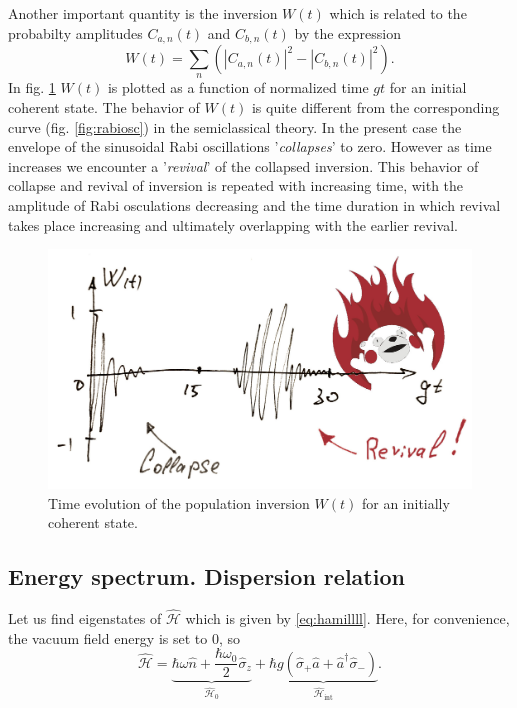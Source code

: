Another important quantity is the inversion $W(t)$ which is related to the probabilty amplitudes $C_{a,n}(t)$ and $C_{b,n}(t)$ by the expression
\begin{equation}
	W(t) = \sum_{n} \left( \left| C_{a,n}(t) \right|^2 - \left| C_{b,n}(t) \right|^2 \right).
\end{equation}
In fig. \ref{fig:candr} $W(t)$ is plotted as a function of normalized time $g t$ for an initial coherent state. The behavior of $W(t)$ is quite different from the corresponding curve (fig. \ref{fig:rabiosc}) in the semiclassical theory. In the present case the envelope of the sinusoidal Rabi oscillations '\textit{collapses}' to zero. However as time increases we encounter a '\textit{revival}' of the collapsed inversion. This behavior of collapse and revival of inversion is repeated with increasing time, with the amplitude of Rabi osculations decreasing and the time duration in which revival takes place increasing and ultimately overlapping with the earlier revival.

\begin{figure}
	\centering
	\includegraphics[width=0.7\linewidth]{fig/L6/c_and_r.jpg}
	\caption{Time evolution of the population inversion $W(t)$ for an initially coherent state.}
	\label{fig:candr}
\end{figure}


\subsection{Energy spectrum. Dispersion relation}

Let us find eigenstates of $\hat{\mathscr{H}}$ which is given by \eqref{eq:hamillll}. Here, for convenience, the vacuum field energy is set to $0$, so
\begin{equation}
	\hat{\mathscr{H}} = \underbrace{\hbar \omega  \hat{n} + \frac{\hbar \omega_0}{2} \hat{\sigma}_z}_{\hat{\mathscr{H}}_0} + \underbrace{\hbar g \left( \hat{\sigma}_+\hat{a} + \hat{a}^{\dagger} \hat{\sigma}_- \right)}_{\hat{\mathscr{H}}_{\text{int}}}.
\end{equation}


